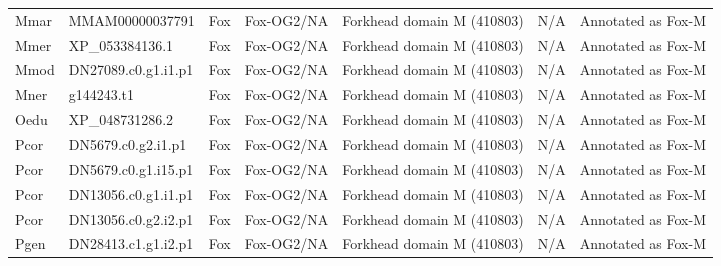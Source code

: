 \documentclass[../main.tex]{subfiles}
\begin{document}
\begin{landscape}
\begin{longtable}{lllllll}
		Mmar           & MMAM00000037791       & Fox            & Fox-OG2/NA          & Forkhead domain M (410803)                  & N/A                                                                    & Annotated as Fox-M   \\
		Mmer           & XP\_053384136.1       & Fox            & Fox-OG2/NA          & Forkhead domain M (410803)                  & N/A                                                                    & Annotated as Fox-M   \\
		Mmod           & DN27089.c0.g1.i1.p1   & Fox            & Fox-OG2/NA          & Forkhead domain M (410803)                  & N/A                                                                    & Annotated as Fox-M   \\
		Mner           & g144243.t1            & Fox            & Fox-OG2/NA          & Forkhead domain M (410803)                  & N/A                                                                    & Annotated as Fox-M   \\
		Oedu           & XP\_048731286.2       & Fox            & Fox-OG2/NA          & Forkhead domain M (410803)                  & N/A                                                                    & Annotated as Fox-M   \\
		Pcor           & DN5679.c0.g2.i1.p1    & Fox            & Fox-OG2/NA          & Forkhead domain M (410803)                  & N/A                                                                    & Annotated as Fox-M   \\
		Pcor           & DN5679.c0.g1.i15.p1   & Fox            & Fox-OG2/NA          & Forkhead domain M (410803)                  & N/A                                                                    & Annotated as Fox-M   \\
		Pcor           & DN13056.c0.g1.i1.p1   & Fox            & Fox-OG2/NA          & Forkhead domain M (410803)                  & N/A                                                                    & Annotated as Fox-M   \\
		Pcor           & DN13056.c0.g2.i2.p1   & Fox            & Fox-OG2/NA          & Forkhead domain M (410803)                  & N/A                                                                    & Annotated as Fox-M   \\
		Pgen           & DN28413.c1.g1.i2.p1   & Fox            & Fox-OG2/NA          & Forkhead domain M (410803)                  & N/A                                                                    & Annotated as Fox-M   \\

\end{longtable}
\end{landscape}
\end{document}
